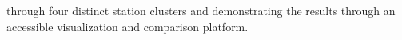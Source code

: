 through four distinct station clusters and demonstrating the results through an accessible visualization and comparison platform.



